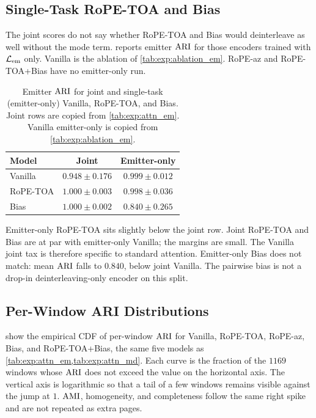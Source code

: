 \subsection{Single-Task RoPE-TOA and Bias}\label{sec:exp:attn_task}

The joint scores do not say whether RoPE-TOA and Bias would deinterleave as well without the mode term.
 reports emitter $\mathrm{ARI}$ for those encoders trained with $\mathcal{L}_{\mathrm{em}}$ only.
Vanilla is the ablation of \cref{tab:exp:ablation_em}.
RoPE-az and RoPE-TOA+Bias have no emitter-only run.

\begin{table}[H]
  \centering
  \small
  \caption{Emitter $\mathrm{ARI}$ for joint and single-task (emitter-only) Vanilla, RoPE-TOA, and Bias. Joint rows are copied from \cref{tab:exp:attn_em}. Vanilla emitter-only is copied from \cref{tab:exp:ablation_em}.}
  \label{tab:exp:attn_em_task}
  \begin{tabular}{@{}lcc@{}}
    \toprule
    Model & Joint & Emitter-only \\
    \midrule
    Vanilla   & $0.948\pm0.176$ & $0.999\pm0.012$ \\
    RoPE-TOA  & $1.000\pm0.003$ & $0.998\pm0.036$ \\
    Bias      & $1.000\pm0.002$ & $0.840\pm0.265$ \\
    \bottomrule
  \end{tabular}
\end{table}

Emitter-only RoPE-TOA sits slightly below the joint row.
Joint RoPE-TOA and Bias are at par with emitter-only Vanilla; the margins are small.
The Vanilla joint tax is therefore specific to standard attention.
Emitter-only Bias does not match: mean $\mathrm{ARI}$ falls to $0.840$, below joint Vanilla.
The pairwise bias is not a drop-in deinterleaving-only encoder on this split.

\subsection{Per-Window ARI Distributions}\label{sec:exp:results:hist}

 show the empirical CDF of per-window $\mathrm{ARI}$ for Vanilla, RoPE-TOA, RoPE-az, Bias, and RoPE-TOA+Bias, the same five models as \cref{tab:exp:attn_em,tab:exp:attn_md}.
Each curve is the fraction of the $1169$ windows whose $\mathrm{ARI}$ does not exceed the value on the horizontal axis.
The vertical axis is logarithmic so that a tail of a few windows remains visible against the jump at $1$.
$\mathrm{AMI}$, homogeneity, and completeness follow the same right spike and are not repeated as extra pages.

